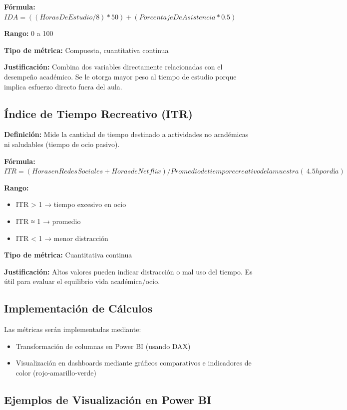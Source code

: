 \documentclass[12pt,letterpaper]{report}
\begin{document}
\textbf{Fórmula:}
\(IDA = ((Horas De Estudio / 8) * 50 ) + (Porcentaje De Asistencia * 0.5)\)

\textbf{Rango:} 0 a 100

\textbf{Tipo de métrica:} Compuesta, cuantitativa continua

\textbf{Justificación:} Combina dos variables directamente relacionadas con el desempeño académico. Se le otorga mayor peso al tiempo de estudio porque implica esfuerzo directo fuera del aula.

\subsection{Índice de Tiempo Recreativo (ITR)}

\textbf{Definición: }Mide la cantidad de tiempo destinado a actividades no académicas ni saludables (tiempo de ocio pasivo).

\textbf{Fórmula:}
\(ITR = (Horas en Redes Sociales + Horas de Netflix)/Promedio de tiempo recreativo de la muestra (~4.5h por día)
\)

\textbf{Rango:} 
\begin{itemize}
    \item ITR > 1 → tiempo excesivo en ocio
    \item ITR ≈ 1 → promedio
    \item ITR < 1 → menor distracción
\end{itemize}

\textbf{Tipo de métrica:} Cuantitativa continua

\textbf{Justificación:} Altos valores pueden indicar distracción o mal uso del tiempo. Es útil para evaluar el equilibrio vida académica/ocio.

\subsection{Implementación de Cálculos}
Las métricas serán implementadas mediante:  
\begin{itemize}
    \item Transformación de columnas en Power BI (usando DAX)
    \item Visualización en dashboards mediante gráficos comparativos e indicadores de color (rojo-amarillo-verde)
\end{itemize}

\subsection{Ejemplos de Visualización en Power BI}
\end{document}
